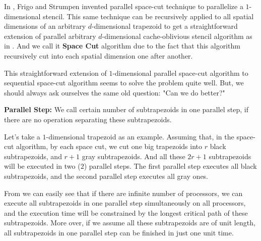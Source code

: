 {In \cite{FrigoSt09}, Frigo and Strumpen invented parallel space-cut technique to parallelize a $1$-dimensional 
stencil. This same technique can be recursively applied to all spatial dimensions of an arbitrary 
$d$-dimensional trapezoid to get a straightforward extension of parallel arbitrary $d$-dimensional 
cache-oblivious
stencil algorithm as in . And we call it \textbf{Space Cut} algorithm due to the fact that this algorithm recursively cut into each spatial dimension one after another.
%

This straightforward extension of $1$-dimensional parallel space-cut algorithm
to sequential space-cut algorithm seems to solve the problem
quite well. But, we should always ask ourselves the same old question:
"Can we do better?"



\begin{mydef}
\textbf{Parallel Step:} We call certain number of subtrapezoids in
one parallel step, if there are no  operation separating
these subtrapezoids.
\label{def:parallelStep}
\end{mydef}

Let's take a $1$-dimensional trapezoid as an example. Assuming that, 
in the space-cut algorithm, by each space cut, we cut
one big trapezoids into $r$ black subtrapezoids, and $r+1$ gray
subtrapezoids. And all these $2r+1$ subtrapezoids will be executed
in two ($2$) parallel steps. The first parallel step executes all black 
subtrapezoids, and the second parallel step executes all gray ones.

From  we can easily see that if there are
infinite number of processors, we can execute all subtrapezoids in 
one parallel step simultaneously on all processors, and the execution time will be
constrained by the longest critical path of these subtrapezoids. More
over, if we assume all these subtrapezoids are of unit length, 
all subtrapezoids in one parallel step can be finished in just one unit
time.

}
